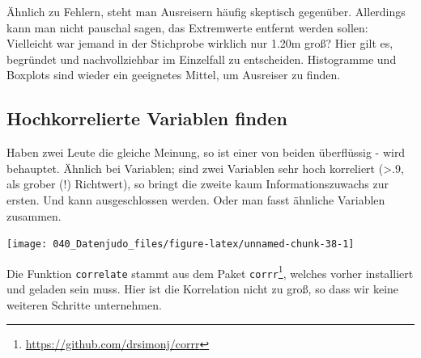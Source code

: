 \documentclass[12pt,]{book}
\newenvironment{Shaded}{\begin{snugshade}}{\end{snugshade}}
\newcommand{\KeywordTok}[1]{\textcolor[rgb]{0.13,0.29,0.53}{\textbf{{#1}}}}
\newcommand{\StringTok}[1]{\textcolor[rgb]{0.31,0.60,0.02}{{#1}}}
\newcommand{\CommentTok}[1]{\textcolor[rgb]{0.56,0.35,0.01}{\textit{{#1}}}}
\newcommand{\NormalTok}[1]{{#1}}
\let\rmarkdownfootnote\footnote%
\def\footnote{\protect\rmarkdownfootnote}
\begin{document}
Ähnlich zu Fehlern, steht man Ausreisern häufig skeptisch gegenüber.
Allerdings kann man nicht pauschal sagen, das Extremwerte entfernt
werden sollen: Vielleicht war jemand in der Stichprobe wirklich nur
1.20m groß? Hier gilt es, begründet und nachvollziehbar im Einzelfall zu
entscheiden. Histogramme und Boxplots sind wieder ein geeignetes Mittel,
um Ausreiser zu finden.

\subsection{Hochkorrelierte Variablen
finden}\label{hochkorrelierte-variablen-finden}

Haben zwei Leute die gleiche Meinung, so ist einer von beiden
überflüssig - wird behauptet. Ähnlich bei Variablen; sind zwei Variablen
sehr hoch korreliert (\textgreater{}.9, als grober (!) Richtwert), so
bringt die zweite kaum Informationszuwachs zur ersten. Und kann
ausgeschlossen werden. Oder man fasst ähnliche Variablen zusammen.

\begin{Shaded}
\end{Shaded}

\begin{center}\texttt{[image: 040\_Datenjudo\_files/figure-latex/unnamed-chunk-38-1]} \end{center}

Die Funktion \texttt{correlate} stammt aus dem Paket
\texttt{corrr}\footnote{\url{https://github.com/drsimonj/corrr}},
welches vorher installiert und geladen sein muss. Hier ist die
Korrelation nicht zu groß, so dass wir keine weiteren Schritte
unternehmen.
\end{document}
